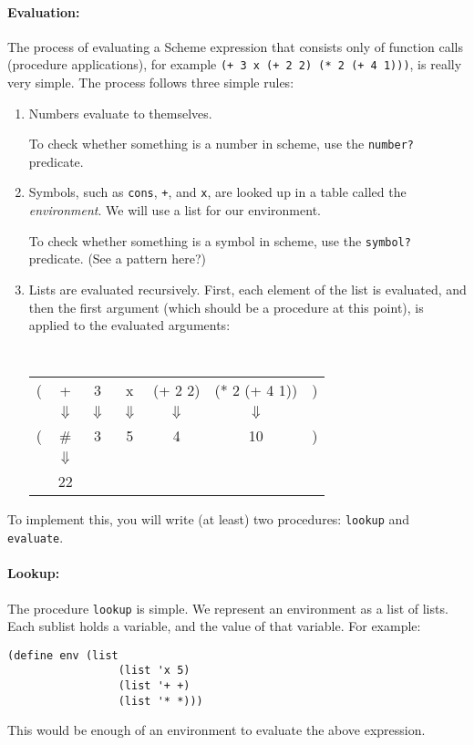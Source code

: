 \documentclass{article}
\begin{document}
\paragraph{Evaluation:}  
The process of evaluating a Scheme expression that consists only of
function calls (procedure applications), for example
{\tt (+  3 x (+ 2 2) (* 2 (+ 4 1)))}, is really very simple.
The process follows three simple rules:
\begin{enumerate}
\item Numbers evaluate to themselves.

  To check whether something
  is a number in scheme, use the {\tt number?} predicate.
\item Symbols, such as {\tt cons}, {\tt +}, and {\tt x},
  are looked up in a table
  called the {\em environment}.  We will use a list for our
  environment.

  To check whether something is a symbol in scheme, use the
  {\tt symbol?} predicate.  (See a pattern here?)
\item Lists are evaluated recursively.  First,
  each element of the list is evaluated, and then the first argument
  (which should be a procedure at this point), is applied to the
  evaluated arguments:

{\tt
  \begin{tabular}{ccccccc}
    ( & + & 3 & x & (+ 2 2) & (* 2 (+ 4 1)) & )\\
    & $\Downarrow$& $\Downarrow$& $\Downarrow$& $\Downarrow$& $\Downarrow$& \\
    ( & \#<procedure:+> & 3 & 5 & 4 & 10 & )\\
    &$\Downarrow$ \\
    &22\\
  \end{tabular}
}
\end{enumerate}

To implement this,  you will write (at least) two procedures:
          {\tt lookup} and {\tt evaluate}.

\paragraph{Lookup:}
The procedure {\tt lookup} is simple.  We represent an environment as
a list of lists.  Each sublist
holds a variable,
and the value of that variable. For example:
\begin{Verbatim}[frame=single]
  (define env (list
                 (list 'x 5)
                 (list '+ +)
                 (list '* *)))
\end{Verbatim}
This would be enough of an environment to evaluate the above
expression.
\end{document}
